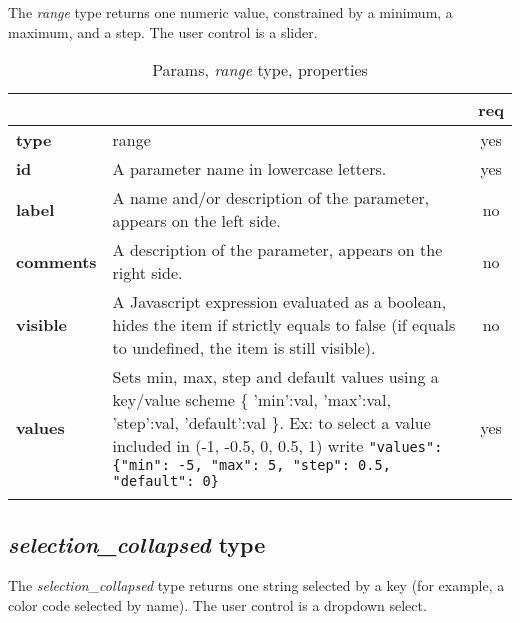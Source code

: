 The \emph{range} type returns one numeric value, constrained 
by a minimum, a maximum, and a step. The user control is a slider.


\begin{longtable}{|>{\bf}L{\linewidth}|L{\linewidth}|c|}
\hline
      &  & {\bf req} 
\tabularnewline \hline \hline
 type   & range       & yes \\ \hline
 id     & A parameter name in lowercase letters. & yes \\ \hline
 label  & A name and/or description of the parameter, appears on the left side. & no
                      \\ \hline
 comments & A description of the parameter, appears on the right side. & no
                      \\ \hline
 visible    & A Javascript expression evaluated as a boolean, hides the item if
              strictly equals to false (if equals to undefined, the item is still visible). 
            & no \\ \hline
 values & Sets min, max, step and default values using a key/value 
scheme \{ 'min':val, 'max':val, 'step':val, 'default':val \}. 
Ex: to select a value included in (-1, -0.5, 0, 0.5, 1) write \texttt{"values": \{"min": -5, "max": 5, "step": 0.5, "default": 0\}}  & yes
                      \\ \hline
\caption{Params, \emph{range} type, properties}
\end{longtable}


\subsection{ \emph{selection\_collapsed} type}

The \emph{selection\_collapsed} type returns one string selected by a key (for example, 
a color code selected by name). The user control is a dropdown select.

